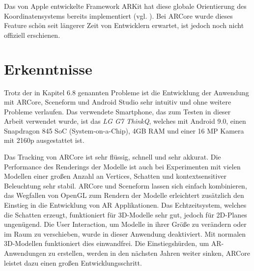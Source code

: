 Das von Apple entwickelte Framework ARKit hat diese globale Orientierung des Koordinatensystems bereits implementiert (vgl. \cite{arkit_global}). Bei ARCore wurde dieses Feature schön seit längerer Zeit von Entwicklern erwartet, ist jedoch noch nicht offiziell erschienen. 

\section{Erkenntnisse}

Trotz der in Kapitel 6.8 genannten Probleme ist die Entwicklung der Anwendung mit ARCore, Sceneform und Android Studio sehr intuitiv und ohne weitere Probleme verlaufen. Das verwendete Smartphone, das zum Testen in dieser Arbeit verwendet wurde, ist das \textit{LG G7 ThinkQ}, welches mit Android 9.0, einen Snapdragon 845 SoC (System-on-a-Chip), 4GB RAM und einer 16 MP Kamera mit 2160p ausgestattet ist.

Das Tracking von ARCore ist sehr flüssig, schnell und sehr akkurat. Die Performance des Renderings der Modelle ist auch bei Experimenten mit vielen Modellen einer großen Anzahl an Vertices, Schatten und kontextsensitiver Beleuchtung sehr stabil. ARCore und Sceneform lassen sich einfach kombinieren, das Wegfallen von OpenGL zum Rendern der Modelle erleichtert zusätzlich den Einstieg in die Entwicklung von AR Applikationen. Das Echtzeitsystem, welches die Schatten erzeugt, funktioniert für 3D-Modelle sehr gut, jedoch für 2D-Planes ungenügend. Die User Interaction, um Modelle in ihrer Größe zu verändern oder im Raum zu verschieben, wurde in dieser Anwendung deaktiviert. Mit normalen 3D-Modellen funktioniert dies einwandfrei. Die Einstiegshürden, um AR-Anwendungen zu erstellen, werden in den nächsten Jahren weiter sinken, ARCore leistet dazu einen großen Entwicklungsschritt.








